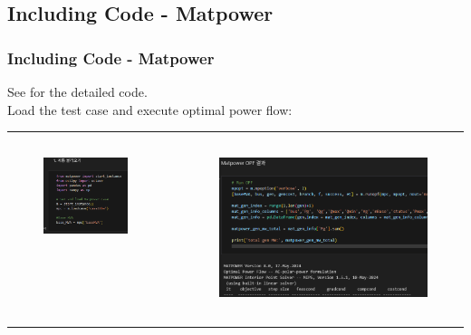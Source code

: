 \documentclass[
	11pt, %
	aspectratio=169, %
]{beamer}
\begin{document}
\subsection{Including Code - Matpower}
\begin{frame}
	\frametitle{Including Code - Matpower}
	
	See \href{https://github.com/kwoong2001/pyomoatoz/blob/main/Optimal_Power_Flow/Basic/33_Bus_Case_with_Matpower/OPF_Case_33bw_matpower.ipynb}{} for the detailed code.\\
	
	Load the test case and execute optimal power flow:
	\rule{\textwidth}{1pt}
	
	\begin{columns}
		\begin{column}{0.5\textwidth}
			\begin{figure}
				\includegraphics[width=2 in,keepaspectratio]{mat_load_case.png}
			\end{figure}
		\end{column}

		\begin{column}{0.5\textwidth}
			\begin{figure}
				\includegraphics[width=2.5 in,keepaspectratio]{mat_opf.png}
			\end{figure}
		\end{column}
	\end{columns}

	\rule{\textwidth}{1pt}

\end{frame}
	
\end{document}
